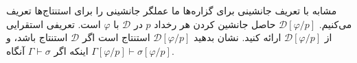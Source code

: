 مشابه با تعریف جانشینی برای گزاره‌ها ما عملگر جانشینی را برای استنتاج‌ها تعریف می‌کنیم.
$\mathcal{D}[\varphi/p]$
حاصل جانشین کردن هر رخداد $p$ در $\mathcal{\mathcal{D}}$ با $\varphi$ است.
تعریفی استقرایی از
$\mathcal{D}[\varphi/p]$
ارائه کنید. نشان بدهید
$\mathcal{D}[\varphi/p]$
استنتاج است اگر
$\mathcal{D}$
استنتاج باشد، و اینکه اگر
$\Gamma\vdash\sigma$
آنگاه
$\Gamma[\varphi/p]\vdash\sigma[\varphi/p]$.